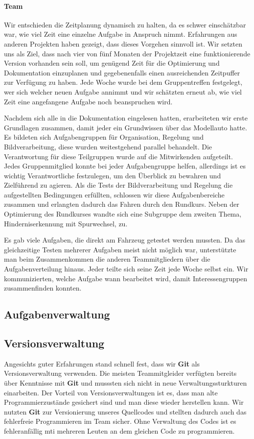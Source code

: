 \paragraph{Team}

Wir entschieden die Zeitplanung dynamisch zu halten, da es schwer einschätzbar war, wie viel Zeit eine einzelne Aufgabe in Anspruch nimmt. Erfahrungen aus anderen Projekten haben gezeigt, dass dieses Vorgehen sinnvoll ist. Wir setzten uns als Ziel, dass nach vier von fünf Monaten der Projektzeit eine funktionierende Version vorhanden sein soll, um genügend Zeit für die Optimierung und Dokumentation einzuplanen und gegebenenfalls einen ausreichenden Zeitpuffer zur Verfügung zu haben. Jede Woche wurde bei dem Gruppentreffen festgelegt, wer sich welcher neuen Aufgabe annimmt und wir schätzten erneut ab, wie viel Zeit eine angefangene Aufgabe noch beanspruchen wird.


Nachdem sich alle in die Dokumentation eingelesen hatten, erarbeiteten wir erste Grundlagen zusammen, damit jeder ein Grundwissen über das Modellauto hatte. Es bildeten sich Aufgabengruppen für Organisation, Regelung und Bildverarbeitung, diese wurden weitestgehend parallel behandelt. Die Verantwortung für diese Teilgruppen wurde auf die Mitwirkenden aufgeteilt. Jedes Gruppenmitglied konnte bei jeder Aufgabengruppe helfen, allerdings ist es wichtig Verantwortliche festzulegen, um den Überblick zu bewahren und Zielführend zu agieren. Als die Tests der Bildverarbeitung und Regelung die aufgestellten Bedingungen erfüllten, schlossen wir diese Aufgabenbereiche zusammen und erlangten dadurch das Fahren durch den Rundkurs. Neben der Optimierung des Rundkurses wandte sich eine Subgruppe dem zweiten Thema, Hinderniserkennung mit Spurwechsel, zu.

Es gab viele Aufgaben, die direkt am Fahrzeug getestet werden mussten. Da das gleichzeitige Testen mehrerer Aufgaben meist nicht möglich war, unterstützte man beim Zusammenkommen die anderen Teammitgliedern über die Aufgabenverteilung hinaus. Jeder teilte sich seine Zeit jede Woche selbst ein. Wir kommunizierten, welche Aufgabe wann bearbeitet wird, damit Interessengruppen zusammenfinden konnten. 

\subsection{Aufgabenverwaltung}
\label{sec:aufgabenverwaltung}


\subsection{Versionsverwaltung}
\label{sec:versionsverwaltung}
Angesichts guter Erfahrungen stand schnell fest, dass wir \textbf{Git} als Versionsverwaltung verwenden. Die meisten Teammitgleider verfügten bereits über Kenntnisse mit \textbf{Git} und musssten sich nicht in neue Verwaltungssturkturen einarbeiten. Der Vorteil von Versionsverwaltungen ist es, dass man alte Programmierzustände gesichert sind und man diese wieder herstellen kann. Wir nutzten \textbf{Git} zur Versionierung unseres Quellcodes und stellten dadurch auch das fehlerfreie Programmieren im Team sicher. Ohne Verwaltung des Codes ist es fehleranfällig  mti mehreren Leuten an dem gleichen Code zu programmieren. 
